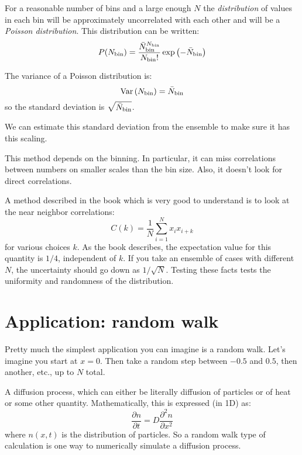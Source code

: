 For a reasonable number of bins and a large enough $N$ the {\it
  distribution} of values in each bin will be approximately
uncorrelated with each other and will be a {\it Poisson
  distribution}. This distribution can be written:
\begin{equation}
P(N_{\rm bin}) = \frac{{\bar N}_{\rm bin}^{N_{\rm bin}}}{N_{\rm bin}!}
\exp\left(-  {\bar N}_{\rm bin}\right)
\end{equation}

The variance of a Poisson distribution is:
\begin{equation}
{\rm Var}\left(N_{\rm bin}\right) = {\bar N}_{\rm bin}
\end{equation}
so the standard deviation is $\sqrt{{\bar N}_{\rm bin}}$.

We can estimate this standard deviation from the ensemble to make sure
it has this scaling. 

This method depends on the binning. In particular, it can miss
correlations between numbers on smaller scales than the bin
size. Also, it doesn't look for direct correlations. 

A method described in the book which is very good to understand is to
look at the near neighbor correlations: 
\begin{equation}
C(k) = \frac{1}{N} \sum_{i=1}^{N} x_i x_{i+k}
\end{equation}
for various choices $k$.  As the book describes, the expectation value
for this quantity is $1/4$, independent of $k$. If you take an
ensemble of cases with different $N$, the uncertainty should go down
as $1/\sqrt{N}$. Testing these facts tests the uniformity and
randomness of the distribution.

\section{Application: random walk}

Pretty much the simplest application you can imagine is a random
walk. Let's imagine you start at $x=0$. Then take a random step
between $-0.5$ and $0.5$, then another, etc., up to $N$ total.


\begin{answer}
  A diffusion process, which can either be literally diffusion of
  particles or of heat or some other quantity. Mathematically, this is
  expressed (in 1D) as:
  \begin{equation}
    \frac{\partial n}{\partial t} = D \frac{\partial^2 n}{\partial
      x^2}
  \end{equation}
   where $n(x, t)$ is the distribution of particles. So a random walk
   type of calculation is one way to numerically simulate a diffusion
   process. 
\end{answer}

